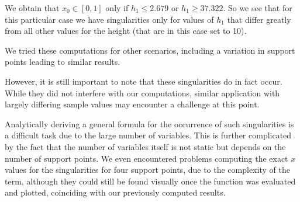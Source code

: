 \documentclass[a4paper, twoside]{article}
\begin{document}
We obtain that $x_0 \in \left[ 0,1 \right]$ only if $h_1 \leq 2.679$ or $h_1 \geq 37.322$. So we see that for this particular case we have singularities only for values of $h_1$ that differ greatly from all other values for the height (that are in this case set to 10).

We tried these computations for other scenarios, including a variation in support points leading to similar results.

However, it is still important to note that these singularities do in fact occur. While they did not interfere with our computations, similar application with largely differing sample values may encounter a challenge at this point.

Analytically deriving a general formula for the occurrence of such singularities is a difficult task due to the large number of variables. This is further complicated by the fact that the number of variables itself is not static but depends on the number of support points. We even encountered problems computing the exact $x$ values for the singularities for four support points, due to the complexity of the term, although they could still be found visually once the function was evaluated and plotted, coinciding with our previously computed results.

\newcommand{\fracsumme}{\mathtt{approx\_int}}



\end{document}
